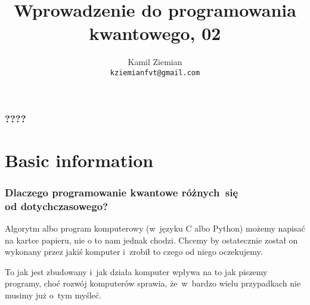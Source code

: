 \documentclass[10pt,t]{beamer}
\title{Wprowadzenie do programowania kwantowego, 02}
\author{Kamil Ziemian \\
 \texttt{kziemianfvt@gmail.com}}
\date{}
\begin{document}






\RaggedRight





\maketitle %










\begin{frame}
  \frametitle{????}


  \tableofcontents %

\end{frame}










\section{Basic information}





\begin{frame}
  \frametitle{Dlaczego programowanie kwantowe różnych~się \\
    od dotychczasowego?}


  Algorytm albo program komputerowy (w~języku C albo Python) możemy
  napisać na kartce papieru, nie o to nam jednak chodzi. Chcemy by
  ostatecznie został on wykonany przez jakiś komputer i~zrobił to
  czego od niego oczekujemy.

  To jak jest zbudowany i~jak działa komputer wpływa na to jak piszemy
  programy, choć rozwój komputerów sprawia, że~w~bardzo wielu
  przypadkach nie musimy już o~tym myśleć.

\end{frame}
\end{document}
